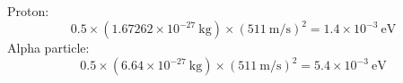 \begin{enumerate}
  Proton:
  \[
  0.5 \times (1.67262\times10^{-27}~\mathrm{kg}) \times (511~\mathrm{m/s})^2
  = 1.4\times10^{-3}~\mathrm{eV}
  \]
  Alpha particle:
  \[
  0.5 \times (6.64\times10^{-27}~\mathrm{kg}) \times (511~\mathrm{m/s})^2
  = 5.4\times10^{-3}~\mathrm{eV}
  \]
\end{enumerate}
